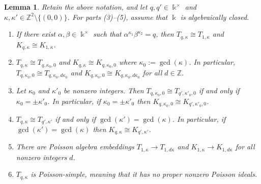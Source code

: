 \documentclass[12pt]{amsart}
\theoremstyle{plain}
\newtheorem{lemma}[theorem]{Lemma}
\numberwithin{theorem}{section}
\numberwithin{equation}{theorem}
\theoremstyle{definition}
\newcommand{\ZZ}{\mathbb{Z}}
\newcommand \kx {\Bbbk^\times}
\begin{document}
\begin{lemma}
\label{zzlem4.1}
Retain the above notation, and let $q, q' \in \kx$ and $\kappa, \kappa' \in \ZZ^2 \setminus \{(0,0)\}$.  For parts {\rm(3)--(5)}, assume that $\Bbbk$ is algebraically closed. 
\begin{enumerate}
\item[(1)]
If there exist $\alpha,\beta \in \kx$ such that $\alpha^{\kappa_1} \beta^{\kappa_2} = q$, then
$T_{q,\kappa}\cong T_{1,\kappa}$ and $K_{q,\kappa}\cong K_{1,\kappa}$.
\item[(2)]
$T_{q,\kappa} \cong T_{q,\kappa_0,0}$ and $K_{q,\kappa} \cong K_{q,\kappa_0,0}$ where $\kappa_0:=\gcd(\kappa)$.
In particular, $T_{q,\kappa_0,0}\cong 
T_{q,\kappa_0,d\kappa_0}$ and $K_{q,\kappa_0,0}\cong 
K_{q,\kappa_0,d\kappa_0}$
for all $d\in {\ZZ}$.
\item[(3)] 
Let $\kappa_0$ and $\kappa'_0$ be nonzero integers.  Then
$T_{q,\kappa_0,0} \cong T_{q',\kappa'_0,0}$
if and only if $\kappa_0=\pm \kappa'_0$.  In particular, if $\kappa_0=\pm \kappa'_0$ then $K_{q,\kappa_0,0} \cong K_{q',\kappa'_0,0}$.
\item[(4)]
$T_{q,\kappa} \cong T_{q',\kappa'}$ if and only if 
$\gcd(\kappa')=\gcd(\kappa)$.  In particular, if $\gcd(\kappa')=\gcd(\kappa)$ then $K_{q,\kappa} \cong K_{q',\kappa'}$.
\item[(5)]
There are Poisson algebra embeddings $T_{1,\kappa}\to 
T_{1,d\kappa}$ and $K_{1,\kappa}\to 
K_{1,d\kappa}$ for all nonzero integers $d$.
\item[(6)]
$T_{q,\kappa}$ is Poisson-simple, meaning that it has no proper nonzero Poisson ideals.
\end{enumerate}
\end{lemma}
\end{document}
